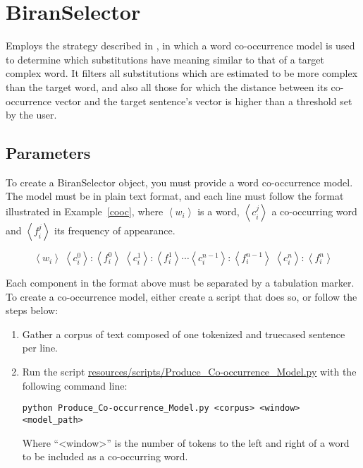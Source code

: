 \section{BiranSelector}

Employs the strategy described in \cite{Biran2011}, in which a word co-occurrence model is used to determine which substitutions have meaning similar to that of a target complex word. It filters all substitutions which are estimated to be more complex than the target word, and also all those for which the distance between its co-occurrence vector and the target sentence's vector is higher than a threshold set by the user.


\subsection{Parameters}

To create a BiranSelector object, you must provide a word co-occurrence model. The model must be in plain text format, and each line must follow the format illustrated in Example~\ref{cooc}, where $\left\langle w_{i} \right\rangle$ is a word, $\left\langle c_{i}^{j} \right\rangle$ a co-occurring word and $\left\langle f_{i}^{j} \right\rangle$ its frequency of appearance.

\begin{equation}
\label{cooc}
\left\langle w_{i} \right\rangle\; \left\langle c_{i}^{0} \right\rangle\!:\!\left\langle f_{i}^{0} \right\rangle\;\left\langle c_{i}^{1} \right\rangle\!:\!\left\langle f_{i}^{1} \right\rangle\cdots\left\langle c_{i}^{n-1} \right\rangle\!:\!\left\langle f_{i}^{n-1} \right\rangle \; \left\langle c_{i}^{n} \right\rangle\!:\!\left\langle f_{i}^{n} \right\rangle
\end{equation}

Each component in the format above must be separated by a tabulation marker. To create a co-occurrence model, either create a script that does so, or follow the steps below:

\begin{enumerate}
\item Gather a corpus of text composed of one tokenized and truecased sentence per line.
\item Run the script \url{resources/scripts/Produce_Co-occurrence_Model.py} with the following command line:

\begin{lstlisting}
python Produce_Co-occurrence_Model.py <corpus> <window> <model_path>
\end{lstlisting}

Where ``<window>'' is the number of tokens to the left and right of a word to be included as a co-occurring word.

\end{enumerate}

